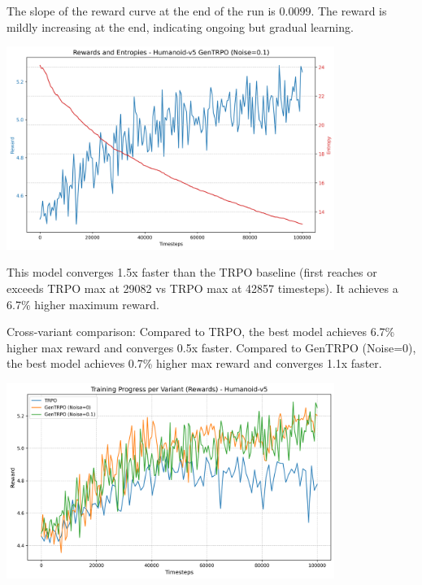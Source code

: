 \documentclass{svproc}
\begin{document}
The slope of the reward curve at the end of the run is 0.0099. The reward is mildly increasing at the end, indicating ongoing but gradual learning.

\begin{center}
\includegraphics[width=0.8\textwidth]{graph_Humanoid-v5_gentrpo-ne_rewards_entropies.png}
\end{center}

This model converges 1.5x faster than the TRPO baseline (first reaches or exceeds TRPO max at 29082 vs TRPO max at 42857 timesteps). It achieves a 6.7\% higher maximum reward.

Cross-variant comparison: Compared to TRPO, the best model achieves 6.7\% higher max reward and converges 0.5x faster. Compared to GenTRPO (Noise=0), the best model achieves 0.7\% higher max reward and converges 1.1x faster. 

\begin{center}
\includegraphics[width=0.8\textwidth]{graph_rewards_Humanoid-v5.png}
\end{center}
\end{document}
